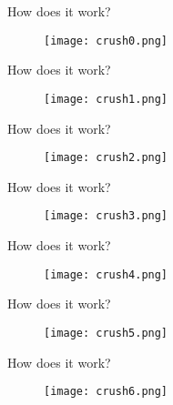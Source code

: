 \begin{frame}{How does it work?}
    \begin{figure}[htpb]
        \centering
        \texttt{[image: crush0.png]}
    \end{figure}
\end{frame}

\begin{frame}{How does it work?}
    \begin{figure}[htpb]
        \centering
        \texttt{[image: crush1.png]}
    \end{figure}
\end{frame}

\begin{frame}{How does it work?}
    \begin{figure}[htpb]
        \centering
        \texttt{[image: crush2.png]}
    \end{figure}
\end{frame}

\begin{frame}{How does it work?}
    \begin{figure}[htpb]
        \centering
        \texttt{[image: crush3.png]}
    \end{figure}
\end{frame}

\begin{frame}{How does it work?}
    \begin{figure}[htpb]
        \centering
        \texttt{[image: crush4.png]}
    \end{figure}
\end{frame}

\begin{frame}{How does it work?}
    \begin{figure}[htpb]
        \centering
        \texttt{[image: crush5.png]}
    \end{figure}
\end{frame}

\begin{frame}{How does it work?}
    \begin{figure}[htpb]
        \centering
        \texttt{[image: crush6.png]}
    \end{figure}
\end{frame}


